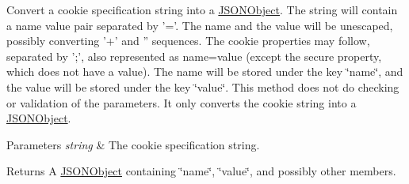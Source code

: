 Convert a cookie specification string into a \hyperlink{classorg_1_1json_1_1JSONObject}{J\-S\-O\-N\-Object}. The string will contain a name value pair separated by '='. The name and the value will be unescaped, possibly converting '+' and '' sequences. The cookie properties may follow, separated by ';', also represented as name=value (except the secure property, which does not have a value). The name will be stored under the key \char`\"{}name\char`\"{}, and the value will be stored under the key \char`\"{}value\char`\"{}. This method does not do checking or validation of the parameters. It only converts the cookie string into a \hyperlink{classorg_1_1json_1_1JSONObject}{J\-S\-O\-N\-Object}. 
\begin{DoxyParams}{Parameters}
{\em string} & The cookie specification string. \\
\hline
\end{DoxyParams}
\begin{DoxyReturn}{Returns}
A \hyperlink{classorg_1_1json_1_1JSONObject}{J\-S\-O\-N\-Object} containing \char`\"{}name\char`\"{}, \char`\"{}value\char`\"{}, and possibly other members. 
\end{DoxyReturn}

